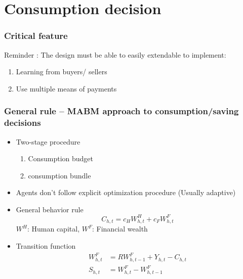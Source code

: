 \section{Consumption decision}

\begin{frame}
    \frametitle{Critical feature}

    Reminder : The design must be able to easily extendable to implement:
    \begin{enumerate}
        \item Learning from buyers/ sellers 
        \item Use multiple means of payments
    \end{enumerate}
    
\end{frame}

\begin{frame}
    \frametitle{General rule -- MABM approach to consumption/saving decisions}

    \begin{itemize}
        \item Two-stage procedure
        \begin{enumerate}
            \item Consumption budget
            \item consumption bundle
        \end{enumerate}
        \item Agents don't follow explicit optimization procedure (Usually adaptive)
        \item General behavior rule 
        \begin{equation*}
            C_{h,t} = c_H W^H_{h,t} + c_F W^F_{h,t}
        \end{equation*}
        $W^H$: Human capital, $W^F$: Financial wealth
        \item Transition function 
        \begin{align*}
            W^F_{h,t} &= R W^F_{h, t-1} + Y_{h, t} - C_{h, t} \\
            S_{h,t} &= W^F_{h,t} - W^F_{h, t-1}
        \end{align*}
    \end{itemize}


\end{frame}

